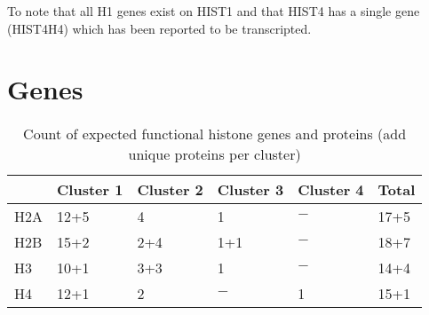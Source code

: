 \documentclass[10pt,a4paper,draft]{article}
\begin{document}
    To note that all H1 genes exist on HIST1 and that HIST4 has a single gene (HIST4H4) which has been reported to be transcripted.

  \section{Genes}
    \begin{table}
      \centering
      \begin{tabular}{l | l | l | l | l | l }
        \null & Cluster 1 & Cluster 2 & Cluster 3 & Cluster 4 & Total \\
        \hline
        H2A   & 12+5      & 4         & 1         & $-$       & 17+5  \\
        H2B   & 15+2      & 2+4       & 1+1       & $-$       & 18+7  \\
        H3    & 10+1      & 3+3       & 1         & $-$       & 14+4  \\
        H4    & 12+1      & 2         & $-$       & 1         & 15+1  \\
      \end{tabular}
      \caption{Count of expected functional histone genes and proteins (add unique proteins per cluster)}
      \label{tab:histone}
    \end{table}
\end{document}
